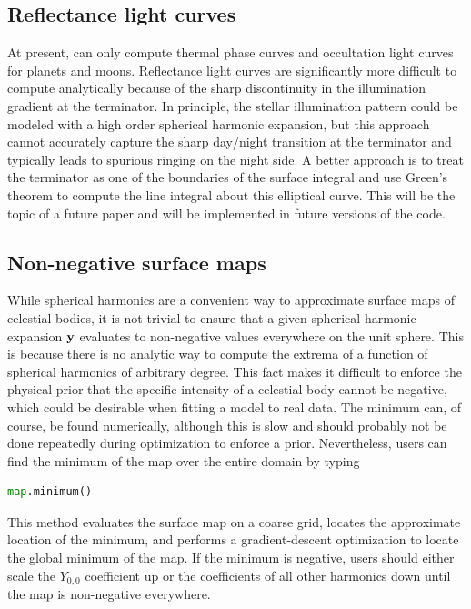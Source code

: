 \documentclass[modern]{aastex61}
\begin{document}
\subsection{Reflectance light curves}
At present, \starry can only compute thermal phase curves and occultation
light curves for planets and moons. Reflectance light curves are significantly
more difficult to compute analytically because of the sharp discontinuity in the
illumination gradient at the terminator. In principle, the stellar illumination
pattern could be modeled with a high order spherical harmonic expansion, but
this approach cannot accurately capture the sharp day/night transition at the
terminator and typically leads to spurious ringing on the night side. A
better approach is to treat the terminator as one of the boundaries of the
surface integral and use Green's theorem to compute the line integral about
this elliptical curve. This will be the topic of a future paper and will
be implemented in future versions of the code.

\subsection{Non-negative surface maps}
\label{sec:nonnegative}
While spherical harmonics are a convenient way to approximate surface
maps of celestial bodies, it is not trivial to ensure
that a given spherical harmonic expansion ${\mathbf{y}}$ evaluates to
non-negative values everywhere on the unit sphere. This is because
there is no analytic way to compute the extrema of a function of
spherical harmonics of arbitrary degree.
This fact makes it difficult to enforce the physical prior that the
specific intensity of a celestial body cannot be negative, which
could be desirable when fitting a model to real data. The minimum
can, of course, be found numerically, although this is slow and
should probably not be done repeatedly during optimization to
enforce a prior. Nevertheless, users can find the minimum of the
map over the entire domain by typing
%
\begin{lstlisting}[language=Python,firstnumber=last]
map.minimum()
\end{lstlisting}
%
This method evaluates the surface map on a coarse grid, locates the
approximate location of the minimum, and performs a gradient-descent
optimization to locate the global minimum of the map. If the minimum
is negative, users should either scale the $Y_{0,0}$ coefficient up
or the coefficients of all other harmonics down until the map is
non-negative everywhere.
\end{document}
